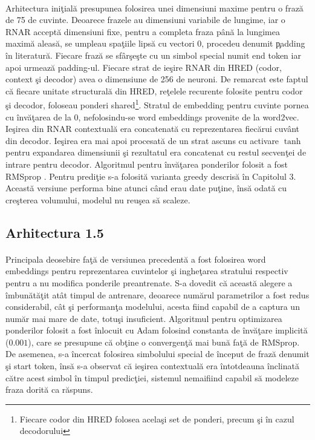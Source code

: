 \paragraph{}
Arhitectura ini\c tial\u a presupunea folosirea unei dimensiuni maxime pentru o fraz\u a de 75 de cuvinte. Deoarece frazele au dimensiuni variabile de lungime, iar o RNAR accept\u a dimensiuni fixe, pentru a completa fraza p\^ an\u a la lungimea maxim\u a aleas\u a, se umpleau spa\c tiile lips\u a cu vectori \(0\), procedeu denumit \c padding \^ in literatur\u a. Fiecare fraz\u a se sf\^ ar\c se\c ste cu un simbol special numit end token iar apoi urmeaz\u a padding-ul.  Fiecare strat de ie\c sire RNAR din HRED (codor, context \c si decodor) avea o dimensiune de 256 de neuroni. De remarcat este faptul c\u a fiecare unitate structural\u a din HRED, re\c telele recurente folosite pentru codor \c si decodor, foloseau ponderi shared\footnote{Fiecare codor din HRED folosea acela\c si set de ponderi, precum \c si \^ in cazul decodorului}. Stratul de embedding pentru cuvinte pornea cu \^ inv\u a\c tarea de la 0, nefolosindu-se word embeddings provenite de la word2vec. Ie\c sirea din RNAR contextual\u a era concatenat\u a cu reprezentarea fiec\u arui cuv\^ ant din decodor. Ie\c sirea era mai apoi procesat\u a de un strat ascuns cu activare \(\tanh\) pentru expandarea dimensiunii \c si rezultatul era concatenat cu restul secven\c tei de intrare pentru decodor. Algoritmul pentru \^ inv\u a\c tarea ponderilor folosit a fost RMSprop \cite{rmsprop}. Pentru predi\c tie s-a folosit\u a varianta greedy descris\u a \^ in Capitolul 3. Aceast\u a versiune performa bine atunci c\^ and erau date pu\c tine, \^ ins\u a odat\u a cu cre\c sterea volumului, modelul nu reu\c sea s\u a scaleze.

\subsection{Arhitectura 1.5}

\paragraph{}
Principala deosebire fa\c t\u a de versiunea precedent\u a a fost folosirea word embeddings pentru reprezentarea cuvintelor \c si inghe\c tarea stratului respectiv pentru a nu modifica ponderile preantrenate. S-a dovedit c\u a aceast\u a alegere a \^ imbun\u at\u a\c tit at\^ at timpul de antrenare, deoarece num\u arul parametrilor a fost redus considerabil, c\^ at \c si performan\c ta modelului, acesta fiind capabil de a captura un num\u ar mai mare de date, totu\c si insuficient. Algoritmul pentru optimizarea ponderilor folosit a fost \^ inlocuit cu Adam \cite{DBLP:journals/corr/KingmaB14} folosind constanta de \^ inv\u a\c tare implicit\u a (\(0.001\)), care se presupune c\u a ob\c tine o convergen\c t\u a mai bun\u a fa\c t\u a de RMSprop. De asemenea, s-a \^ incercat folosirea simbolului special de \^ inceput de fraz\u a denumit \c si start token, \^ ins\u a s-a observat c\u a ie\c sirea contextual\u a era \^ intotdeauna \^ inclinat\u a c\u atre acest simbol \^ in timpul predic\c tiei, sistemul nemaifiind capabil s\u a modeleze fraza dorit\u a ca r\u aspuns.

